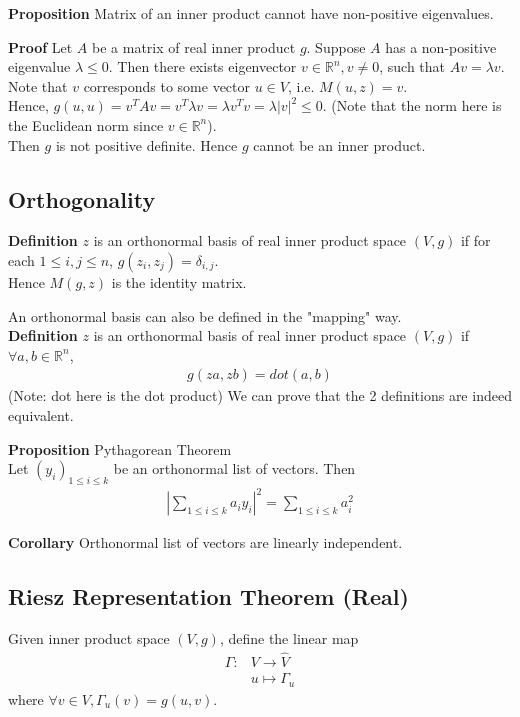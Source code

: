 \documentclass{article}
\begin{document}
\textbf{Proposition} Matrix of an inner product cannot have non-positive eigenvalues.

\textbf{Proof} Let $A$ be a matrix of real inner product $g$. Suppose $A$ has a non-positive eigenvalue $\lambda \leq 0$. Then there exists eigenvector $v\in \mathbb{R}^n, v\neq 0$, such that $Av=\lambda v$. Note that $v$ corresponds to some vector $u\in V$, i.e. $M(u, z)=v$.\\
Hence, $g(u,u)=v^TAv=v^T\lambda v=\lambda v^Tv = \lambda |v|^2 \leq 0$. (Note that the norm here is the Euclidean norm since $v\in \mathbb{R}^n$).\\
Then $g$ is not positive definite. Hence $g$ cannot be an inner product.

\subsection{Orthogonality}
\textbf{Definition} $z$ is an orthonormal basis of real inner product space $(V,g)$ if for each $1\leq i,j\leq n$, $g(z_i,z_j)=\delta_{i,j}$.\\
Hence $M(g,z)$ is the identity matrix.

An orthonormal basis can also be defined in the "mapping" way.\\
\textbf{Definition} $z$ is an orthonormal basis of real inner product space $(V,g)$ if $\forall a,b\in \mathbb{R}^n$,
\begin{align*}
	g(za, zb) = dot(a,b)
\end{align*}
(Note: dot here is the dot product)
We can prove that the 2 definitions are indeed equivalent.

\textbf{Proposition} Pythagorean Theorem\\
Let $(y_i)_{1\leq i\leq k}$ be an orthonormal list of vectors. Then 
\begin{align*}
	\left\lvert \sum_{1\leq i\leq k}a_iy_i\right\rvert^2 = \sum_{1\leq i\leq k}a_i^2
\end{align*}

\textbf{Corollary} Orthonormal list of vectors are linearly independent.

\subsection{Riesz Representation Theorem (Real)}
Given inner product space $(V,g)$, define the linear map
\begin{align*}
	\Gamma: &V\rightarrow \hat{V}\\
	&u\mapsto \Gamma_u
\end{align*}
where $\forall v\in V, \Gamma_u(v) = g(u,v)$.
\end{document}
